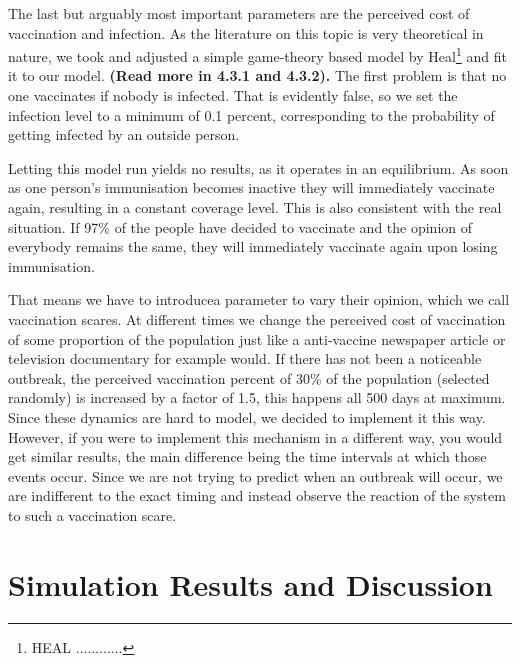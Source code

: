\documentclass[11pt]{article}
\begin{document}
The last but arguably most important parameters are the perceived cost of vaccination and infection. As the literature on this topic is very theoretical in nature, we took and adjusted a simple game-theory based model by Heal\footnote{HEAL ............} and fit it to our model. \textbf{(Read more in 4.3.1 and 4.3.2).} The first problem is that no one vaccinates if nobody is infected. That is evidently false, so we set the infection level to a minimum of 0.1 percent, corresponding to the probability of getting infected by an outside person.
\vspace{14px}


Letting this model run yields no results, as it operates in an equilibrium. As soon as one person’s immunisation becomes inactive they will immediately vaccinate again, resulting in a constant coverage level. This is also consistent with the real situation. If 97\% of the people have decided to vaccinate and the opinion of everybody remains the same, they will immediately vaccinate again upon losing immunisation.
\vspace{14px}

That means we have to introducea parameter to vary their opinion, which we call vaccination scares. At different times we change the perceived cost of vaccination of some proportion of the population just like a anti-vaccine newspaper article or television documentary for example would.
If there has not been a noticeable outbreak, the perceived vaccination percent of 30\% of the population (selected randomly) is increased by a factor of 1.5, this happens all 500 days at maximum. Since these dynamics are hard to model, we decided to implement it this way. However, if you were to implement this mechanism in a different way, you would get similar results, the main difference being the time intervals at which those events occur. Since we are not trying to predict when an outbreak will occur, we are indifferent to the exact timing and instead observe the reaction of the system to such a vaccination scare. 




\section{Simulation Results and Discussion}
\end{document}
